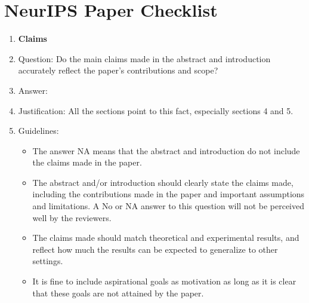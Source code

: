 \documentclass{article}
\begin{document}

\newpage
\section*{NeurIPS Paper Checklist}



\begin{enumerate}

\item {\bf Claims}
    \item[] Question: Do the main claims made in the abstract and introduction accurately reflect the paper's contributions and scope?
    \item[] Answer: \answerYes{} %
    \item[] Justification: All the sections point to this fact, especially sections 4 and 5.
    \item[] Guidelines:
    \begin{itemize}
        \item The answer NA means that the abstract and introduction do not include the claims made in the paper.
        \item The abstract and/or introduction should clearly state the claims made, including the contributions made in the paper and important assumptions and limitations. A No or NA answer to this question will not be perceived well by the reviewers. 
        \item The claims made should match theoretical and experimental results, and reflect how much the results can be expected to generalize to other settings. 
        \item It is fine to include aspirational goals as motivation as long as it is clear that these goals are not attained by the paper. 
    \end{itemize}


\end{enumerate}
\end{document}
